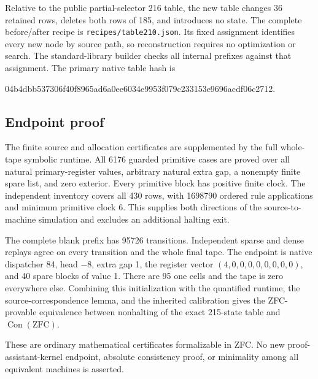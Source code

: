 Relative to the public partial-selector 216 table, the new table changes 36
retained rows, deletes both rows of 185, and introduces no state. The complete
before/after recipe is \texttt{recipes/table210.json}. Its fixed assignment
identifies every new node by source path, so reconstruction requires no
optimization or search. The standard-library builder checks all internal
prefixes against that assignment. The primary native table hash is
\begin{center}\small\ttfamily
04b4dbb537306f40f8965ad6a0ee6034e9953f079c233153e9696acdf06c2712.
\end{center}

\subsection{Endpoint proof}

The finite source and allocation certificates are supplemented by the full
whole-tape symbolic runtime. All 6176 guarded primitive cases are proved over
all natural primary-register values, arbitrary natural extra gap, a nonempty
finite spare list, and zero exterior. Every primitive block has positive finite
clock. The independent inventory covers all 430 rows, with 1698790 ordered rule
applications and minimum primitive clock 6. This supplies both directions of
the source-to-machine simulation and excludes an additional halting exit.

The complete blank prefix has 95726 transitions. Independent sparse and dense
replays agree on every transition and the whole final tape. The endpoint is
native dispatcher 84, head $-8$, extra gap 1, the register vector
$(4,0,0,0,0,0,0,0,0)$, and 40 spare blocks of value 1. There are 95 one cells and the
tape is zero everywhere else. Combining this initialization with the quantified
runtime, the source-correspondence lemma, and the inherited calibration gives
the ZFC-provable equivalence between nonhalting of the exact 215-state table and
$\operatorname{Con}(\mathrm{ZFC})$.

These are ordinary mathematical certificates formalizable in ZFC. No new
proof-assistant-kernel endpoint, absolute consistency proof, or minimality
among all equivalent machines is asserted.
